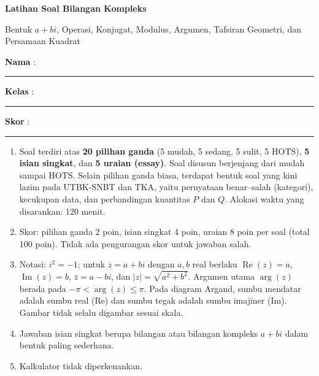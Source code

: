 \documentclass[a4paper,11pt]{article}
\renewcommand{\Re}{\operatorname{Re}}
\renewcommand{\Im}{\operatorname{Im}}
\newcounter{no}
\begin{document}
\thispagestyle{fancy}

\begin{center}
  {\color{redx}\fontsize{22}{26}\selectfont\bfseries Latihan Soal Bilangan Kompleks\par}
  \vspace{2pt}
  {\color{pinkx}\large Bentuk $a+bi$, Operasi, Konjugat, Modulus, Argumen, Tafsiran Geometri, dan Persamaan Kuadrat\par}
\end{center}
\vspace{2pt}
\begin{tcolorbox}[colback=softbg,colframe=redx!40,boxrule=0.6pt,arc=3pt,left=8pt,right=8pt,top=5pt,bottom=5pt]
\noindent\textbf{Nama} : \rule{4.6cm}{0.4pt}\hfill\textbf{Kelas} : \rule{2.2cm}{0.4pt}\hfill\textbf{Skor} : \rule{2.2cm}{0.4pt}
\end{tcolorbox}
\vspace{2pt}
\begin{tcolorbox}[colback=white,colframe=pinkx,boxrule=0.8pt,arc=3pt,left=8pt,right=8pt,top=4pt,bottom=4pt,title={\bfseries Petunjuk Pengerjaan},coltitle=white,fonttitle=\small]
\small
\begin{enumerate}[leftmargin=1.4em,itemsep=1pt,topsep=1pt]
\item Soal terdiri atas \textbf{20 pilihan ganda} (5 mudah, 5 sedang, 5 sulit, 5 HOTS), \textbf{5 isian singkat}, dan \textbf{5 uraian (essay)}. Soal disusun berjenjang dari mudah sampai HOTS. Selain pilihan ganda biasa, terdapat bentuk soal yang kini lazim pada UTBK-SNBT dan TKA, yaitu pernyataan benar--salah (kategori), kecukupan data, dan perbandingan kuantitas $P$ dan $Q$. Alokasi waktu yang disarankan: 120 menit.
\item Skor: pilihan ganda 2 poin, isian singkat 4 poin, uraian 8 poin per soal (total 100 poin). Tidak ada pengurangan skor untuk jawaban salah.
\item Notasi: $i^2=-1$; untuk $z=a+bi$ dengan $a,b$ real berlaku $\Re(z)=a$, $\Im(z)=b$, $\bar z=a-bi$, dan $|z|=\sqrt{a^2+b^2}$. Argumen utama $\arg(z)$ berada pada $-\pi<\arg(z)\le\pi$. Pada diagram Argand, sumbu mendatar adalah sumbu real (Re) dan sumbu tegak adalah sumbu imajiner (Im). Gambar tidak selalu digambar sesuai skala.
\item Jawaban isian singkat berupa bilangan atau bilangan kompleks $a+bi$ dalam bentuk paling sederhana.
\item Kalkulator tidak diperkenankan.
\end{enumerate}
\end{tcolorbox}
\end{document}
